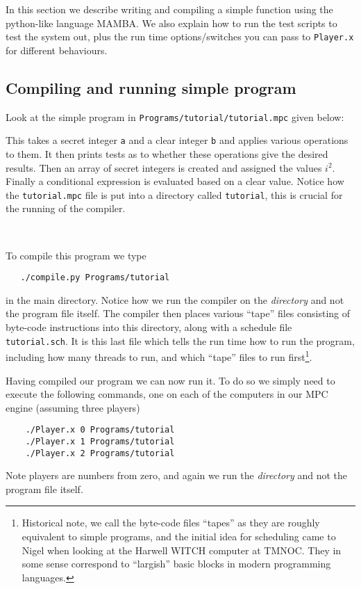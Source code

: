 \label{sec:example}
In this section we describe writing and compiling a simple
function using the python-like language MAMBA.
We also explain how to run the test scripts to test the system
out, plus the run time options/switches you can pass to 
\verb+Player.x+ for different behaviours.

\subsection{Compiling and running simple program}
Look at the simple program in \verb+Programs/tutorial/tutorial.mpc+
given below:


This takes a secret integer \verb+a+ and a clear integer \verb+b+
and applies various operations to them. It then prints tests
as to whether these operations give the desired results.
Then an array of secret integers is created and assigned the
values $i^2$. Finally a conditional expression is evaluated
based on a clear value.
Notice how the \verb+tutorial.mpc+ file is put into a directory
called \verb+tutorial+, this is crucial for the running of
the compiler.

~~

\noindent
To compile this program we type
\begin{verbatim}
   ./compile.py Programs/tutorial
\end{verbatim}
in the main directory. Notice how we run the compiler on the
{\em directory} and not the program file itself.
The compiler then places various ``tape'' files consisting of 
byte-code instructions into this directory, along with a
schedule file \verb+tutorial.sch+. It is this last file which
tells the run time how to run the program, including how
many threads to run, and which ``tape'' files to run 
first\footnote{Historical note, we call the byte-code files ``tapes''
as they are roughly equivalent to simple programs, and
the initial idea for scheduling came to Nigel when looking at
the Harwell WITCH computer at TMNOC. They in some sense
correspond to ``largish'' basic blocks in modern programming
languages.}.

Having compiled our program we can now run it. To do so
we simply need to execute the following commands, one on
each of the computers in our MPC engine (assuming three players)
\begin{verbatim}
    ./Player.x 0 Programs/tutorial
    ./Player.x 1 Programs/tutorial
    ./Player.x 2 Programs/tutorial
\end{verbatim}
Note players are numbers from zero, and again we run the
{\em directory} and not the program file itself.

